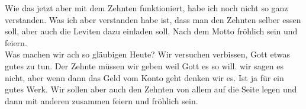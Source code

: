 Wie das jetzt aber mit dem Zehnten funktioniert, habe ich noch nicht so ganz verstanden. Was ich aber verstanden habe ist, dass man den Zehnten selber essen soll, aber auch die Leviten dazu einladen soll. Nach dem Motto fröhlich sein und feiern.\\
Was machen wir ach so gläubigen Heute? Wir versuchen verbissen, Gott etwas gutes zu tun. \flqq Der Zehnte müssen wir geben weil Gott es so will.\frqq{} wir sagen es nicht, aber wenn dann das Geld vom Konto geht denken wir es. \flqq Ist ja für ein gutes Werk.\frqq{} Wir sollen aber auch den Zehnten von allem auf die Seite legen und dann mit anderen zusammen feiern und fröhlich sein.\\


 
